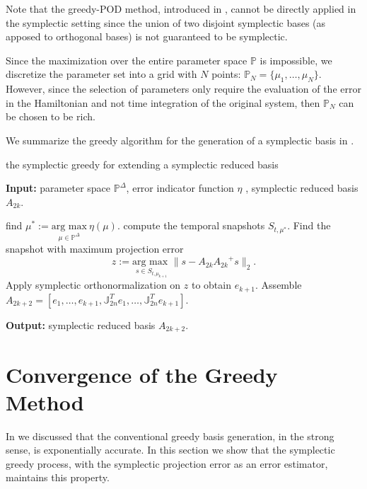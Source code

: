 Note that the greedy-POD method, introduced in , cannot be directly applied in the symplectic setting since the union of two disjoint symplectic bases (as apposed to orthogonal bases) is not guaranteed to be symplectic.

Since the maximization over the entire parameter space $\mathbb P$ is impossible, we discretize the parameter set into a grid with $N$ points: $\mathbb P_N = \{ \mu_1,\dots,\mu_N\}$. However, since the selection of parameters only require the evaluation of the error in the Hamiltonian and not time integration of the original system, then $\mathbb P_N$ can be chosen to be rich. 

We summarize the greedy algorithm for the generation of a symplectic basis in .

\begin{algorithm} 
	\caption{the symplectic greedy for extending a symplectic reduced basis} \label{alg:4.1}
	\textbf{Input:} parameter space $\mathbb P^{\Delta}$, error indicator function $\eta$ , symplectic reduced basis $A_{2k}$.
	\begin{algorithmic} [1]
		\State find $\mu^* := \underset{\mu \in \mathbb P^{\Delta}}{\text{arg\ max}} \ \eta(\mu)$.
		\State compute the temporal snapshots $S_{t,\mu^*}$.
		\State Find the snapshot with maximum projection error
		\[
			z := \underset{s\in S_{t,\mu_{k+1}}}{\text{arg\ max }} \| s - A_{2k}{A_{2k}}^+s \|_2.
		\]
		\State Apply symplectic orthonormalization on $z$ to obtain $e_{k+1}$.
		\State Assemble $A_{2k+2} = [e_1,\dots,e_{k+1},\mathbb J_{2n}^T e_1,\dots,\mathbb J_{2n}^T e_{k+1} ]$.
	\end{algorithmic}
	\vspace{0.5cm}
	\textbf{Output:} symplectic reduced basis $A_{2k+2}$.
\end{algorithm}


\section{Convergence of the Greedy Method} \label{p1.sec:SyMo.PrSy:4}

In  we discussed that the conventional greedy basis generation, in the strong sense, is exponentially accurate. In this section we show that the symplectic greedy process, with the symplectic projection error as an error estimator, maintains this property.

